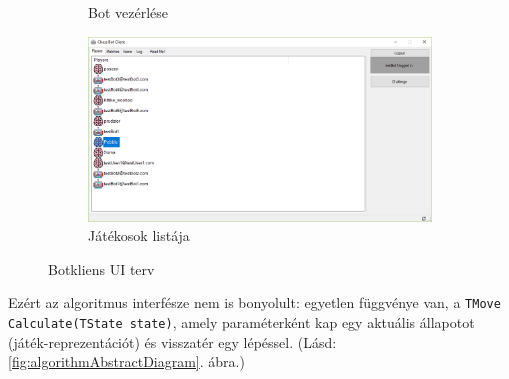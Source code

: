 \documentclass[twoside, a4paper, 12pt]{article}
\begin{document}
\begin{figure}
\begin{subfigure}[b]{0.475\textwidth}
		\caption{Bot vezérlése}
		\label{fig:botClientGame}
	\end{subfigure}
	\quad
	\begin{subfigure}[b]{0.475\textwidth}   
		\centering 
		\includegraphics[width=\textwidth]{img/botClientPlayers.png}
		\caption{Játékosok listája}
		\label{fig:botClientPlayers}
	\end{subfigure}
	\caption[ Botkliens UI terv ]
	{\small Botkliens UI terv}
	\label{fig:botClient}
\end{figure}




































Ezért az algoritmus interfésze nem is bonyolult: egyetlen függvénye van, a \texttt{TMove Calculate(TState state)}, amely paraméterként kap egy aktuális állapotot (játék-reprezentációt) és visszatér egy lépéssel. (Lásd: \ref{fig:algorithmAbstractDiagram}. ábra.)
\end{document}
